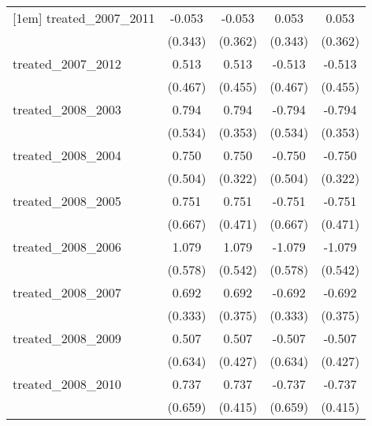 {\begin{tabular}{l*{4}{c}}
[1em]
treated\_2007\_2011&      -0.053         &      -0.053         &       0.053         &       0.053         \\
            &     (0.343)         &     (0.362)         &     (0.343)         &     (0.362)         \\
[1em]
treated\_2007\_2012&       0.513         &       0.513         &      -0.513         &      -0.513         \\
            &     (0.467)         &     (0.455)         &     (0.467)         &     (0.455)         \\
[1em]
treated\_2008\_2003&       0.794         &       0.794\sym{*}  &      -0.794         &      -0.794\sym{*}  \\
            &     (0.534)         &     (0.353)         &     (0.534)         &     (0.353)         \\
[1em]
treated\_2008\_2004&       0.750         &       0.750\sym{*}  &      -0.750         &      -0.750\sym{*}  \\
            &     (0.504)         &     (0.322)         &     (0.504)         &     (0.322)         \\
[1em]
treated\_2008\_2005&       0.751         &       0.751         &      -0.751         &      -0.751         \\
            &     (0.667)         &     (0.471)         &     (0.667)         &     (0.471)         \\
[1em]
treated\_2008\_2006&       1.079         &       1.079\sym{*}  &      -1.079         &      -1.079\sym{*}  \\
            &     (0.578)         &     (0.542)         &     (0.578)         &     (0.542)         \\
[1em]
treated\_2008\_2007&       0.692\sym{*}  &       0.692         &      -0.692\sym{*}  &      -0.692         \\
            &     (0.333)         &     (0.375)         &     (0.333)         &     (0.375)         \\
[1em]
treated\_2008\_2009&       0.507         &       0.507         &      -0.507         &      -0.507         \\
            &     (0.634)         &     (0.427)         &     (0.634)         &     (0.427)         \\
[1em]
treated\_2008\_2010&       0.737         &       0.737         &      -0.737         &      -0.737         \\
            &     (0.659)         &     (0.415)         &     (0.659)         &     (0.415)         \\

\end{tabular}}
